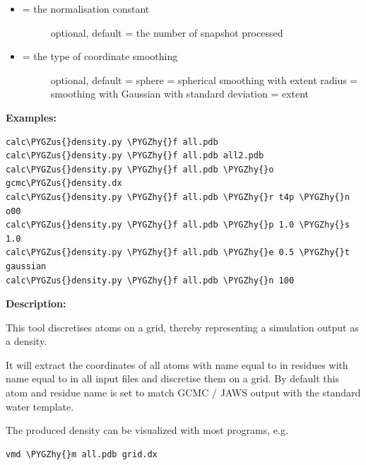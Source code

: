 \documentclass[letterpaper,10pt,english]{sphinxmanual}
\def\PYGZus{\char`\_}
\def\PYGZhy{\char`\-}
\begin{document}
\begin{itemize}
\begin{description}
\end{description}

\item {} \begin{description}
\item[{ = the normalisation constant}] \leavevmode
optional, default = the number of snapshot processed

\end{description}

\item {} \begin{description}
\item[{ = the type of coordinate smoothing}] \leavevmode
optional, default = sphere
 = spherical smoothing with extent radius
 = smoothing with Gaussian with standard deviation = extent

\end{description}

\end{itemize}

\textbf{Examples:}

\begin{Verbatim}[frame=single,commandchars=\\\{\}]
calc\PYGZus{}density.py \PYGZhy{}f all.pdb
calc\PYGZus{}density.py \PYGZhy{}f all.pdb all2.pdb
calc\PYGZus{}density.py \PYGZhy{}f all.pdb \PYGZhy{}o gcmc\PYGZus{}density.dx
calc\PYGZus{}density.py \PYGZhy{}f all.pdb \PYGZhy{}r t4p \PYGZhy{}n o00
calc\PYGZus{}density.py \PYGZhy{}f all.pdb \PYGZhy{}p 1.0 \PYGZhy{}s 1.0
calc\PYGZus{}density.py \PYGZhy{}f all.pdb \PYGZhy{}e 0.5 \PYGZhy{}t gaussian
calc\PYGZus{}density.py \PYGZhy{}f all.pdb \PYGZhy{}n 100
\end{Verbatim}

\textbf{Description:}

This tool discretises atoms on a grid, thereby representing a simulation output as a density.

It will extract the coordinates of all atoms with name equal to  in residues with name equal to  in all input files and discretise them on a grid. By default this atom and residue name is set to match GCMC / JAWS output with the standard water template.

The produced density can be visualized with most programs, e.g.

\begin{Verbatim}[frame=single,commandchars=\\\{\}]
vmd \PYGZhy{}m all.pdb grid.dx
\end{Verbatim}
\end{document}
